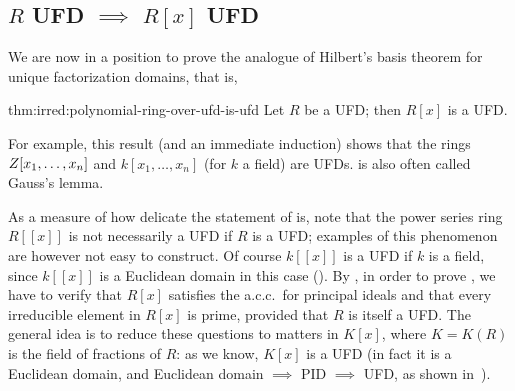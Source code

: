 \subsection{\texorpdfstring{$R$ UFD $\implies$ $R[x]$ UFD}{R UFD
    implies R[x] UFD}}
\label{subsec:irred:r-ufd-implies-r-x-ufd}
We are now in a position to prove the analogue of Hilbert's basis
theorem for unique factorization domains, that is,

\begin{thm}{}{thm:irred:polynomial-ring-over-ufd-is-ufd}
  Let $R$ be a UFD; then $R[x]$ is a UFD.
\end{thm}
For example, this result (and an immediate induction) shows that the
rings $Z[x_1, \dots, x_n]$ and $k[x_1, \dots, x_n]$ (for $k$ a field)
are UFDs.  is also often called Gauss's lemma.

As a measure of how delicate the statement of 
is, note that the power series ring $R[[x]]$ is not necessarily a UFD
if $R$ is a UFD; examples of this phenomenon are however not easy to
construct. Of course $k[[x]]$ is a UFD if $k$ is a field, since
$k[[x]]$ is a Euclidean domain in this case
().  By
, in order to prove , we have
to verify that $R[x]$ satisfies the a.c.c.\ for principal ideals and
that every irreducible element in $R[x]$ is prime, provided that $R$
is itself a UFD. The general idea is to reduce these questions to
matters in $K[x]$, where $K = K(R)$ is the field of fractions of $R$:
as we know, $K[x]$ is a UFD (in fact it is a Euclidean domain, and
Euclidean domain $\implies$ PID $\implies$ UFD, as shown
in~).

